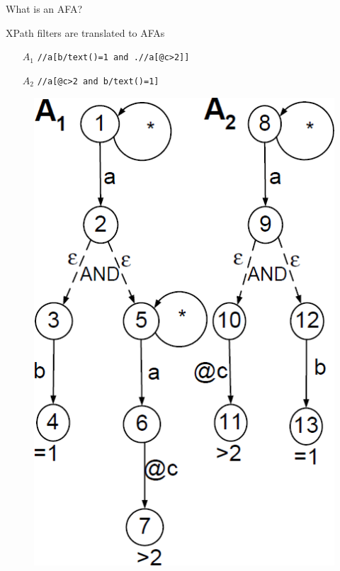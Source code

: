 \documentclass[mathserif,serif]{beamer}
\begin{document}
\begin{frame}{What is an AFA?}
  \begin{minipage}{0.63\textwidth}
    XPath filters are translated to AFAs
    \begin{itemize}
      \item[$A_1$] \texttt{//a[b/text()=1 and .//a[@c>2]]}
      \item[$A_2$] \texttt{//a[@c>2 and b/text()=1]}
    \end{itemize}
  \end{minipage}
  \begin{minipage}{0.35\textwidth}
  \begin{figure}
    \centering
    \includegraphics[width=\textwidth]{AFA.png}
  \end{figure}
\end{minipage}
\end{frame}
\end{document}
